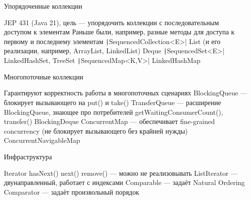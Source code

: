 \documentclass{../../slides-style}
\begin{document}
    \begin{frame}{Упорядоченные коллекции}
        \begin{outline}
            \1 JEP 431 (Java 21), цель --- упорядочить коллекции с последовательным доступом к элементам
                \2 Раньше были, например, разные методы для доступа к первому и последнему элементам
            \1 \texttt|SequencedCollection<E>|
                \2 List (и его реализации, например, ArrayList, LinkedList)
                \2 Deque 
            \1 \texttt|SequencedSet<E>|
                \2 LinkedHashSet, TreeSet
            \1 \texttt|SequencedMap<K,V>|
                \2 LinkedHashMap
        \end{outline}
    \end{frame}

    \begin{frame}{Многопоточные коллекции}
        \begin{outline}
            \1 Гарантируют корректность работы в многопоточных сценариях
            \1 BlockingQueue --- блокирует вызывающего на put() и take()
                \2 TransferQueue --- расширение BlockingQueue, знающее про потребителей
                    \3 getWaitingConsumerCount(), transfer()
            \1 BlockingDeque
            \1 ConcurrentMap --- обеспечивает fine-grained concurrency (не блокирует вызывающего без крайней нужды)
            \1 ConcurrentNavigableMap
        \end{outline}
    \end{frame}

    \begin{frame}{Инфраструктура}
        \begin{outline}
            \1 Iterator
                \2 hasNext()
                \2 next()
                \2 remove() --- можно не реализовывать
            \1 ListIterator --- двунаправленный, работает с индексами
            \1 Comparable --- задаёт Natural Ordering
            \1 Comparator --- задаёт произвольный порядок
        \end{outline}
    \end{frame}
\end{document}

